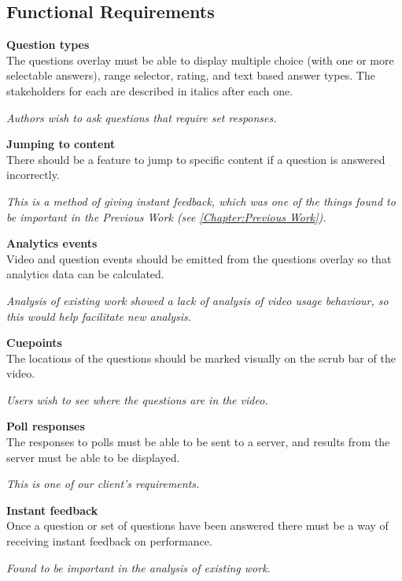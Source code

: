 \subsection{Functional Requirements}
\begin{requirement}[label=\textbf{F\arabic*}]
	\item \textbf{Question types}  \label{Req:Question types} \hfill \\ 
		The questions overlay must be able to display multiple choice (with one or more selectable answers), range selector, rating, and text based answer types. The stakeholders for each are described in italics after each one.

		\textit{Authors wish to ask questions that require set responses.}

	\item \textbf{Jumping to content} \label{Req:Jumping to content} \hfill \\ 
		There should be a feature to jump to specific content if a question is answered incorrectly.

		\textit{This is a method of giving instant feedback, which was one of the things found to be important in the Previous Work (see \autoref{Chapter:Previous Work}).}

	\item \textbf{Analytics events} \label{Req:Analytics events} \hfill \\ 
		Video and question events should be emitted from the questions overlay so that analytics data can be calculated.

		\textit{Analysis of existing work showed a lack of analysis of video usage behaviour, so this would help facilitate new analysis.}

	\item \textbf{Cuepoints} \label{Req:Cuepoints} \hfill \\ 
		The locations of the questions should be marked visually on the \gls{scrub bar} of the video.

		\textit{Users wish to see where the questions are in the video.}

	\item \textbf{Poll responses} \label{Req:Poll responses} \hfill \\ 
		The responses to polls must be able to be sent to a server, and results from the server must be able to be displayed.

		\textit{This is one of our client's requirements.}

	\item \textbf{Instant feedback} \label{Req:Instant feedback} \hfill \\ 
		Once a question or set of questions have been answered there must be a way of receiving instant feedback on performance.

		\textit{Found to be important in the analysis of existing work.}
\end{requirement}

